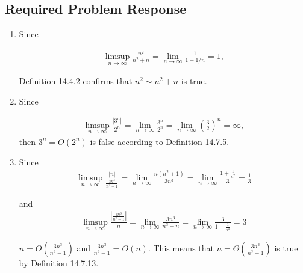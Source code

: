 \documentclass[fleqn,10pt]{olplainarticle}
\begin{document}
        \subsection*{Required Problem Response}
            \begin{enumerate}
                \item Since
                
                    \begin{align*}
                        \limsup_{n \to \infty} \frac{n^2}{n^2 + n} = \lim_{n \to \infty} \frac{1}{1 + 1/n} = 1,
                    \end{align*}
                    
                     Definition 14.4.2 confirms that $n^2 \sim n^2 + n$ is true. 
                     
                 \item Since
                
                    \begin{align*}
                        \limsup_{n \to \infty} \frac{|3^n|}{2^n} = \lim_{n \to \infty} \frac{3^n}{2^n} = \lim_{n \to \infty} \left(\frac{3}{2}\right)^n = \infty,
                    \end{align*}
                    then $3^n = O\left(2^n\right)$ is false according to Definition 14.7.5.
                    
                \item Since 
                    \begin{align*}
                        \limsup_{n \to \infty} \frac{|n|}{\frac{3n^3}{n^2 -1}} = \lim_{n \to \infty} \frac{n(n^2 + 1)}{3n^3} = \lim_{n \to \infty} \frac{1 + \frac{1}{n^2}}{3} = \frac{1}{3}
                    \end{align*}
                    
                    and 
                    \begin{align*}
                        \limsup_{n \to \infty} \frac{\left|\frac{3n^3}{n^2 -1}\right|}{n} = \lim_{n \to \infty} \frac{3n^3}{n^3 - n} = \lim_{n \to \infty} \frac{3}{1 - \frac{1}{n^2}} = 3
                    \end{align*}
                    
                    $n = O\left(\frac{3n^3}{n^2 - 1}\right)$ and $\frac{3n^3}{n^2 - 1} = O(n)$. This means that $n = \Theta\left(\frac{3n^3}{n^2 - 1}\right)$ is true by Definition 14.7.13.
                
            \end{enumerate}
            
\end{document}

